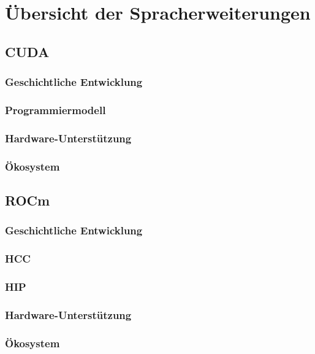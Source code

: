 \section{Übersicht der Spracherweiterungen}

\subsection{CUDA}

\subsubsection{Geschichtliche Entwicklung}

\subsubsection{Programmiermodell}

\subsubsection{Hardware-Unterstützung}

\subsubsection{Ökosystem}

\subsection{ROCm}

\subsubsection{Geschichtliche Entwicklung}

\subsubsection{HCC}

\subsubsection{HIP}

\subsubsection{Hardware-Unterstützung}

\subsubsection{Ökosystem}


